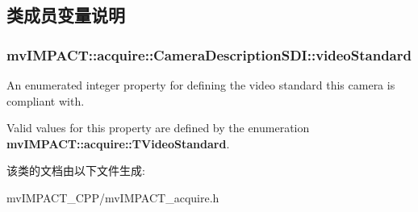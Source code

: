 \subsection{类成员变量说明}
\hypertarget{classmv_i_m_p_a_c_t_1_1acquire_1_1_camera_description_s_d_i_a6ba8278510409ac4019fd858f3af3452}{
\subsubsection[{video\+Standard}]{ mv\+I\+M\+P\+A\+C\+T\+::acquire\+::\+Camera\+Description\+S\+D\+I\+::video\+Standard}}\label{classmv_i_m_p_a_c_t_1_1acquire_1_1_camera_description_s_d_i_a6ba8278510409ac4019fd858f3af3452}


An enumerated integer property for defining the video standard this camera is compliant with. 

Valid values for this property are defined by the enumeration {\bfseries mv\+I\+M\+P\+A\+C\+T\+::acquire\+::\+T\+Video\+Standard}. 

该类的文档由以下文件生成\+:\begin{DoxyCompactItemize}
\item 
mv\+I\+M\+P\+A\+C\+T\+\_\+\+C\+P\+P/mv\+I\+M\+P\+A\+C\+T\+\_\+acquire.\+h\end{DoxyCompactItemize}
